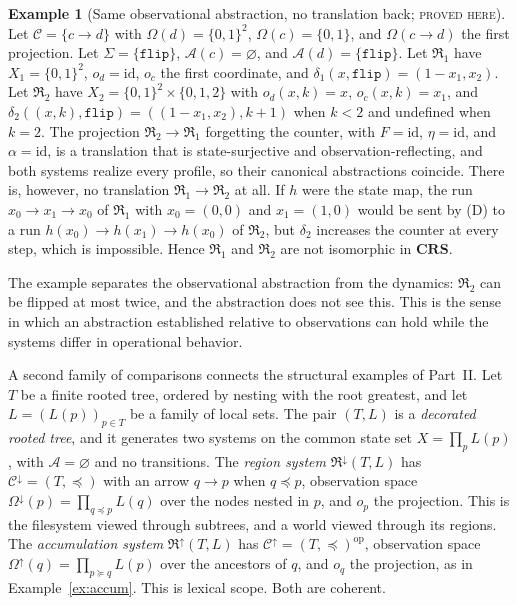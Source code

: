 \documentclass[11pt]{article}
\theoremstyle{definition}
\newtheorem{example}[theorem]{Example}
\theoremstyle{remark}
\newcommand{\stN}{\textsc{proved here}}
\newcommand{\cC}{\mathcal C}
\newcommand{\cA}{\mathcal A}
\newcommand{\fR}{\mathfrak R}
\newcommand{\CRS}{\mathbf{CRS}}
\newcommand{\op}{\mathrm{op}}
\newcommand{\id}{\mathrm{id}}
\begin{document}
\begin{example}[Same observational abstraction, no translation back; \stN]\label{ex:flip}
Let $\cC=\{c\to d\}$ with $\Omega(d)=\{0,1\}^2$, $\Omega(c)=\{0,1\}$, and $\Omega(c\to d)$ the first projection. Let $\Sigma=\{\texttt{flip}\}$, $\cA(c)=\varnothing$, and $\cA(d)=\{\texttt{flip}\}$. Let $\fR_1$ have $X_1=\{0,1\}^2$, $o_d=\id$, $o_c$ the first coordinate, and $\delta_1(x,\texttt{flip})=(1-x_1,x_2)$. Let $\fR_2$ have $X_2=\{0,1\}^2\times\{0,1,2\}$ with $o_d(x,k)=x$, $o_c(x,k)=x_1$, and $\delta_2((x,k),\texttt{flip})=((1-x_1,x_2),k+1)$ when $k<2$ and undefined when $k=2$. The projection $\fR_2\to\fR_1$ forgetting the counter, with $F=\id$, $\eta=\id$, and $\alpha=\id$, is a translation that is state-surjective and observation-reflecting, and both systems realize every profile, so their canonical abstractions coincide. There is, however, no translation $\fR_1\to\fR_2$ at all. If $h$ were the state map, the run $x_0\to x_1\to x_0$ of $\fR_1$ with $x_0=(0,0)$ and $x_1=(1,0)$ would be sent by (D) to a run $h(x_0)\to h(x_1)\to h(x_0)$ of $\fR_2$, but $\delta_2$ increases the counter at every step, which is impossible. Hence $\fR_1$ and $\fR_2$ are not isomorphic in $\CRS$.
\end{example}

The example separates the observational abstraction from the dynamics: $\fR_2$ can be flipped at most twice, and the abstraction does not see this. This is the sense in which an abstraction established relative to observations can hold while the systems differ in operational behavior.

A second family of comparisons connects the structural examples of Part~II. Let $T$ be a finite rooted tree, ordered by nesting with the root greatest, and let $L=(L(p))_{p\in T}$ be a family of local sets. The pair $(T,L)$ is a \emph{decorated rooted tree}, and it generates two systems on the common state set $X=\prod_pL(p)$, with $\cA=\varnothing$ and no transitions. The \emph{region system} $\fR^{\downarrow}(T,L)$ has $\cC^{\downarrow}=(T,\preceq)$ with an arrow $q\to p$ when $q\preceq p$, observation space $\Omega^{\downarrow}(p)=\prod_{q\preceq p}L(q)$ over the nodes nested in $p$, and $o_p$ the projection. This is the filesystem viewed through subtrees, and a world viewed through its regions. The \emph{accumulation system} $\fR^{\uparrow}(T,L)$ has $\cC^{\uparrow}=(T,\preceq)^{\op}$, observation space $\Omega^{\uparrow}(q)=\prod_{p\succeq q}L(p)$ over the ancestors of $q$, and $o_q$ the projection, as in Example~\ref{ex:accum}. This is lexical scope. Both are coherent.
\end{document}
